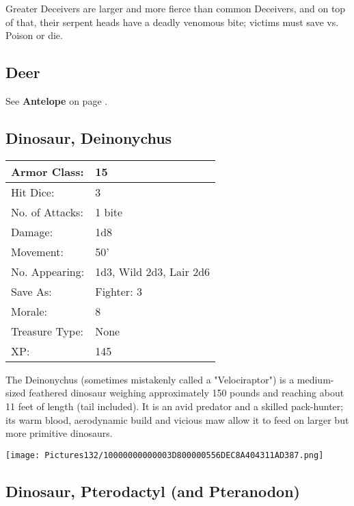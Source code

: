 \documentclass[a4paper,twoside,openany,10pt]{book}
\begin{document}
\begin{multicols}{2}
Greater Deceivers are larger and more fierce than common Deceivers, and on top of that, their serpent heads have a deadly venomous bite; victims must save vs. Poison or die.

\subsection*{Deer}\label{deer}

See \textbf{Antelope} on page \hyperlink{antelope}{\pageref{antelope}}.

\subsection*{Dinosaur, Deinonychus}\label{dinosaur-deinonychus}

\begin{tabularx}{0.48\textwidth}{@{}lX@{}}
Armor Class: & 15 \\\hline
Hit Dice: & 3 \\\hline
No. of Attacks: & 1 bite \\\hline
Damage: & 1d8 \\\hline
Movement: & 50' \\\hline
No. Appearing: & 1d3, Wild 2d3, Lair 2d6 \\\hline
Save As: & Fighter: 3 \\\hline
Morale: & 8 \\\hline
Treasure Type: & None \\\hline
XP: & 145 \\\hline
\end{tabularx}\medskip

The Deinonychus (sometimes mistakenly called a "Velociraptor") is a medium-sized feathered dinosaur weighing approximately 150 pounds and reaching about 11 feet of length (tail included). It is an avid predator and a skilled pack-hunter; its warm blood, aerodynamic build and vicious maw allow it to feed on larger but more primitive dinosaurs.

\begin{center}
	\texttt{[image: Pictures132/10000000000003D800000556DEC8A404311AD387.png]}
\end{center}

\subsection*{Dinosaur, Pterodactyl (and Pteranodon)}\label{dinosaur-pterodactyl-and-pteranodon}


\end{multicols}
\end{document}
